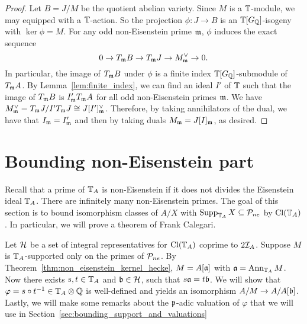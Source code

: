\documentclass[thesis.tex]{subfiles}
\begin{document}
\begin{proof}
Let $B=J/M$ be the quotient abelian variety. Since $M$ is a $\TT$-module,
we may equipped with a $\TT$-action. So the projection $\phi:J \to B$ is an
$\TT[G_\QQ]$-isogeny with $\ker\phi = M$. For any odd non-Eisenstein prime
$\m$, $\phi$ induces the exact sequence
\[
    0 \to T_\m B \to T_\m J \to M^\vee _\m \to 0.
\]
In particular, the image of $T_\m B$ under $\phi$ is a finite index
$\TT[G_\QQ]$-submodule of $T_\m A$. By Lemma~\ref{lem:finite_index}, we can find
an ideal $I'$ of $\TT$ such that the image of $T_\m B$ is $I' _\m T_\m A$
for all odd non-Eisenstein primes $\m$. We have $M^\vee _\m = T_\m J / I'
T_\m J\cong J[I']_\m ^\vee$. Therefore, by taking annihilators of the dual,
we have that $I_\m = I'_\m$ and then by taking duals $M_\m = J[I]_\m$, as
desired.
\end{proof}

\section{Bounding non-Eisenstein part}%
\label{sec:bounding_non_eisenstein_part}

Recall that a prime of $\TT_A$ is non-Eisenstein if it does not divides the
Eisenstein ideal $\TT_A$. There are infinitely many non-Eisenstein primes. The
goal of this section is to bound isomorphism classes of $A/X$ with
$\Supp_{\TT_A} X\subseteq \P_{ne}$ by $\Cl(\TT_A)$. In particular, we will
prove a theorem of Frank Calegari.

Let $\H$ be a set of integral representatives for $\Cl(\TT_A)$ coprime to
$2\I_A$. Suppose $M$ is $\TT_A$-supported only on the primes of $\P_{ne}$. By
Theorem~\ref{thm:non_eisenstein_kernel_hecke}, $M=A[\a]$ with $\a=\Ann_{\TT_A}
M$. Now there exists $s,t\in \TT_A$ and $\b \in \H$, such that $s\a=t\b$. We
will show that $\varphi=s\circ t^{-1}\in \TT_A\otimes \QQ$ is well-defined and
yields an isomorphism $A/M\to A/A[\b]$. Lastly, we will make some remarks about
the $\p$-adic valuation of $\varphi$ that we will use in
Section~\ref{sec:bounding_support_and_valuations} 
\end{document}
